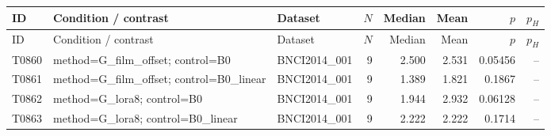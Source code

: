\begin{longtable}{p{.45in}p{2.6in}p{.75in}rrrrr}
\toprule
ID & Condition / contrast & Dataset & $N$ & Median & Mean & $p$ & $p_H$ \\
\midrule
\endfirsthead
\toprule
ID & Condition / contrast & Dataset & $N$ & Median & Mean & $p$ & $p_H$ \\
\midrule
\endhead
T0860 & method=G\_\allowbreak{}film\_\allowbreak{}offset; control=B0 & BNCI2014\_\allowbreak{}001 & 9 & 2.500 & 2.531 & 0.05456 & -- \\
T0861 & method=G\_\allowbreak{}film\_\allowbreak{}offset; control=B0\_\allowbreak{}linear & BNCI2014\_\allowbreak{}001 & 9 & 1.389 & 1.821 & 0.1867 & -- \\
T0862 & method=G\_\allowbreak{}lora8; control=B0 & BNCI2014\_\allowbreak{}001 & 9 & 1.944 & 2.932 & 0.06128 & -- \\
T0863 & method=G\_\allowbreak{}lora8; control=B0\_\allowbreak{}linear & BNCI2014\_\allowbreak{}001 & 9 & 2.222 & 2.222 & 0.1714 & -- \\
\bottomrule
\end{longtable}
